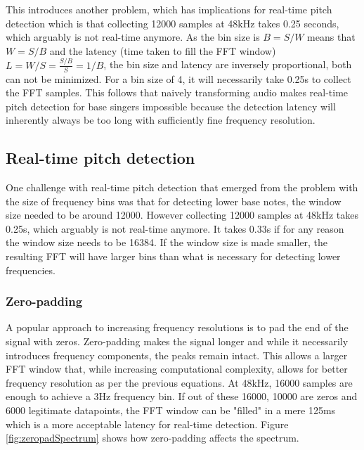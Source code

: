 This introduces another problem, which has implications for real-time pitch detection which is that collecting 12000 samples at 48kHz takes 0.25 seconds, which arguably is not real-time anymore. As the bin size is $B = S/W$ means that $W = S/B$ and the latency (time taken to fill the FFT window) $L = W/S = \frac{S/B}{S} = 1/B$, the bin size and latency are inversely proportional, both can not be minimized. For a bin size of 4, it will necessarily take 0.25s to collect the FFT samples. This follows that naively transforming audio makes real-time pitch detection for base singers impossible because the detection latency will inherently always be too long with sufficiently fine frequency resolution.

\subsection{Real-time pitch detection}
One challenge with real-time pitch detection that emerged from the problem with the size of frequency bins was that for detecting lower base notes, the window size needed to be around 12000. However collecting 12000 samples at 48kHz takes 0.25s, which arguably is not real-time anymore. It takes 0.33s if for any reason the window size needs to be 16384. If the window size is made smaller, the resulting FFT will have larger bins than what is necessary for detecting lower frequencies. 
\subsubsection{Zero-padding}
A popular approach to increasing frequency resolutions is to pad the end of the signal with zeros. Zero-padding makes the signal longer and while it necessarily introduces frequency components, the peaks remain intact. This allows a larger FFT window that, while increasing computational complexity, allows for better frequency resolution as per the previous equations. At 48kHz, 16000 samples are enough to achieve a 3Hz frequency bin. If out of these 16000, 10000 are zeros and 6000 legitimate datapoints, the FFT window can be "filled" in a mere 125ms which is a more acceptable latency for real-time detection. Figure \ref{fig:zeropadSpectrum} shows how zero-padding affects the spectrum.

